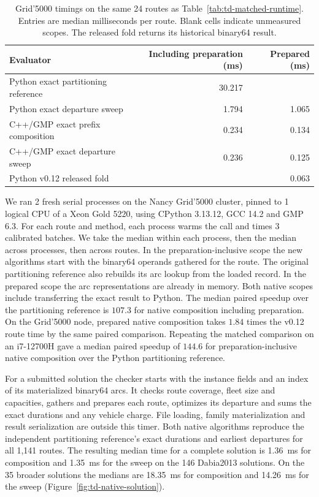 \begin{table}[htbp]
\centering
\small
\begin{tabular}{@{}lrr@{}}
\toprule
Evaluator & Including preparation (ms) & Prepared (ms)\\
\midrule
Python exact partitioning reference & 30.217 & \\
Python exact departure sweep & 1.794 & 1.065\\
C++/GMP exact prefix composition & 0.234 & 0.134\\
C++/GMP exact departure sweep & 0.236 & 0.125\\
Python v0.12 released fold & & 0.063\\
\bottomrule
\end{tabular}
\caption{Grid'5000 timings on the same 24 routes as Table~\ref{tab:td-matched-runtime}. Entries are median milliseconds per route. Blank cells indicate unmeasured scopes. The released fold returns its historical binary64 result.}\label{tab:td-native-route}
\end{table}

We ran 2 fresh serial processes on the Nancy Grid'5000 cluster, pinned to 1 logical CPU of a Xeon Gold 5220, using CPython 3.13.12, GCC 14.2 and GMP 6.3. For each route and method, each process warms the call and times 3 calibrated batches. We take the median within each process, then the median across processes, then across routes. In the preparation-inclusive scope the new algorithms start with the binary64 operands gathered for the route. The original partitioning reference also rebuilds its arc lookup from the loaded record. In the prepared scope the arc representations are already in memory. Both native scopes include transferring the exact result to Python. The median paired speedup over the partitioning reference is $107.3$ for native composition including preparation. On the Grid'5000 node, prepared native composition takes $1.84$ times the v0.12 route time by the same paired comparison. Repeating the matched comparison on an i7-12700H gave a median paired speedup of $144.6$ for preparation-inclusive native composition over the Python partitioning reference.

For a submitted solution the checker starts with the instance fields and an index of its materialized binary64 arcs. It checks route coverage, fleet size and capacities, gathers and prepares each route, optimizes its departure and sums the exact durations and any vehicle charge. File loading, family materialization and result serialization are outside this timer. Both native algorithms reproduce the independent partitioning reference's exact durations and earliest departures for all 1,141 routes. The resulting median time for a complete solution is 1.36~ms for composition and 1.35~ms for the sweep on the 146 Dabia2013 solutions. On the 35 broader solutions the medians are 18.35~ms for composition and 14.26~ms for the sweep (Figure~\ref{fig:td-native-solution}).

